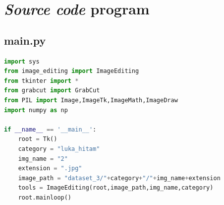 \appendix


\chapter{\emph{Source code} program}

\section{main.py}
\begin{lstlisting}[language=Python,basicstyle=\tiny]
import sys
from image_editing import ImageEditing
from tkinter import *
from grabcut import GrabCut
from PIL import Image,ImageTk,ImageMath,ImageDraw
import numpy as np

if __name__ == '__main__':
    root = Tk()
    category = "luka_hitam"
    img_name = "2"
    extension = ".jpg"
    image_path = "dataset_3/"+category+"/"+img_name+extension
    tools = ImageEditing(root,image_path,img_name,category)
    root.mainloop()
\end{lstlisting}

